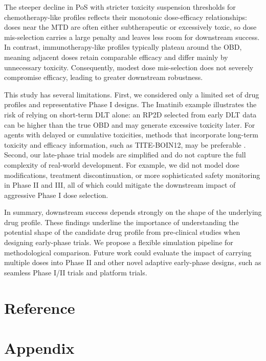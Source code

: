 \documentclass[11pt]{article}
\begin{document}
The steeper decline in PoS with stricter toxicity suspension thresholds for chemotherapy-like profiles reflects their monotonic dose-efficacy relationships: doses near the MTD are often either subtherapeutic or excessively toxic, so dose mis-selection carries a large penalty and leaves less room for downstream success. In contrast, immunotherapy-like profiles typically plateau around the OBD, meaning adjacent doses retain comparable efficacy and differ mainly by unnecessary toxicity. Consequently, modest dose mis-selection does not severely compromise efficacy, leading to greater downstream robustness.

This study has several limitations. First, we considered only a limited set of drug profiles and representative Phase I designs. The Imatinib example illustrates the risk of relying on short-term DLT alone: an RP2D selected from early DLT data can be higher than the true OBD and may generate excessive toxicity later. For agents with delayed or cumulative toxicities, methods that incorporate long-term toxicity and efficacy information, such as TITE-BOIN12, may be preferable \parencite{TITE-BOIN12}. Second, our late-phase trial models are simplified and do not capture the full complexity of real-world development. For example, we did not model dose modifications, treatment discontinuation, or more sophisticated safety monitoring in Phase II and III, all of which could mitigate the downstream impact of aggressive Phase I dose selection.

In summary, downstream success depends strongly on the shape of the underlying drug profile. These findings underline the importance of understanding the potential shape of the candidate drug profile from pre-clinical studies when designing early-phase trials. We propose a flexible simulation pipeline for methodological comparison. Future work could evaluate the impact of carrying multiple doses into Phase II and other novel adaptive early-phase designs, such as seamless Phase I/II trials and platform trials.


\newpage
{}
\section*{Reference}
\printbibliography [heading=none]

\appendix
\renewcommand{\thefigure}{S\arabic{figure}}
\setcounter{figure}{0}
\renewcommand{\thetable}{S\arabic{table}}
\setcounter{table}{0}
\newpage
\section*{Appendix}
\end{document}
